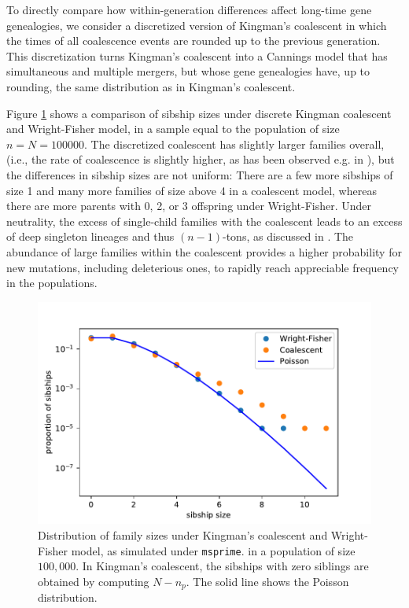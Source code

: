 \documentclass[9pt,twocolumn,twoside,lineno]{gsajnl}
\begin{document}
To directly compare how within-generation differences affect long-time gene genealogies, 
we consider a discretized version of Kingman's coalescent in which the times of 
all coalescence events are rounded up to the previous generation. 
This discretization turns Kingman's coalescent into a Cannings model that has simultaneous and 
multiple mergers, but whose gene genealogies have, up to rounding, the same distribution as in 
Kingman's coalescent. 

Figure \ref{sibships} shows a comparison of sibship sizes under discrete Kingman coalescent 
and Wright-Fisher model, in a sample equal to the population of size $n=N=100 000$. 
The discretized coalescent has slightly larger families overall,
 (i.e., the rate of coalescence is slightly higher, as has been observed e.g. in \cite{Fu2006}), but 
the differences in sibship sizes are not uniform: There are a few more sibships of size 1 and many more families of size above 4 
in a coalescent model, whereas there are more parents with 0, 2, or 3 offspring under Wright-Fisher. Under neutrality, 
the excess of single-child families with the coalescent leads to an excess of deep singleton lineages and thus $(n-1)$-tons,
as discussed in \cite{Fu2006}. The abundance of large families within the coalescent provides a higher probability for
 new mutations, including deleterious ones, to rapidly reach appreciable frequency in the populations.
 
 \begin{figure}
  \centering
  \includegraphics[width=\columnwidth]{fig/familysizes.pdf}

  \caption{\label{sibships} Distribution of family sizes under Kingman's coalescent and Wright-Fisher model, as
     simulated under \texttt{msprime}.
  \cite{Nelson2020} in a population of size $100,000$. In Kingman's coalescent, the sibships with zero 
  siblings are obtained by computing $N-n_p.$  The solid line shows the Poisson distribution.}


\end{figure}
 
\end{document}
